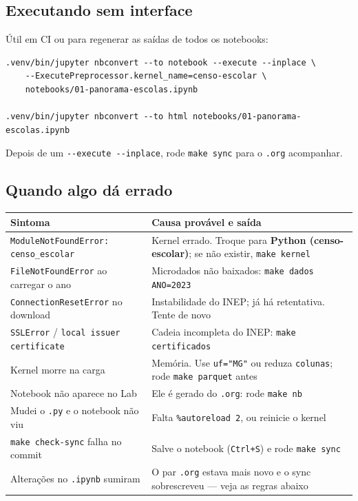 \documentclass[11pt]{article}
\begin{document}
\subsection*{Executando sem interface}
\label{sec:org5639c43}

Útil em CI ou para regenerar as saídas de todos os notebooks:

\begin{verbatim}
.venv/bin/jupyter nbconvert --to notebook --execute --inplace \
    --ExecutePreprocessor.kernel_name=censo-escolar \
    notebooks/01-panorama-escolas.ipynb

.venv/bin/jupyter nbconvert --to html notebooks/01-panorama-escolas.ipynb
\end{verbatim}

Depois de um \texttt{-{}-{}execute -{}-{}inplace}, rode \texttt{make sync} para o \texttt{.org} acompanhar.
\subsection*{Quando algo dá errado}
\label{sec:org774487d}

\begin{center}
\begin{tabular}{ll}
Sintoma & Causa provável e saída\\
\hline
\texttt{ModuleNotFoundError: censo\_escolar} & Kernel errado. Troque para \textbf{Python (censo-escolar)}; se não existir, \texttt{make kernel}\\
\texttt{FileNotFoundError} ao carregar o ano & Microdados não baixados: \texttt{make dados ANO=2023}\\
\texttt{ConnectionResetError} no download & Instabilidade do INEP; já há retentativa. Tente de novo\\
\texttt{SSLError} / \texttt{local issuer certificate} & Cadeia incompleta do INEP: \texttt{make certificados}\\
Kernel morre na carga & Memória. Use \texttt{uf="MG"} ou reduza \texttt{colunas}; rode \texttt{make parquet} antes\\
Notebook não aparece no Lab & Ele é gerado do \texttt{.org}: rode \texttt{make nb}\\
Mudei o \texttt{.py} e o notebook não viu & Falta \texttt{\%autoreload 2}, ou reinicie o kernel\\
\texttt{make check-sync} falha no commit & Salve o notebook (\texttt{Ctrl+S}) e rode \texttt{make sync}\\
Alterações no \texttt{.ipynb} sumiram & O par \texttt{.org} estava mais novo e o sync sobrescreveu — veja as regras abaixo\\
\end{tabular}
\end{center}
\end{document}
